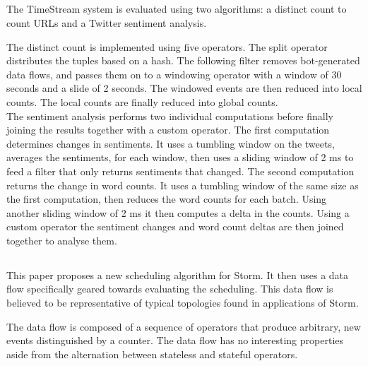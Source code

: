 \subsection{}
The TimeStream system\cite{timestream} is evaluated using two algorithms: a distinct count to count URLs and a Twitter sentiment analysis. \\


The distinct count is implemented using five operators. The split operator distributes the tuples based on a hash. The following filter removes bot-generated data flows, and passes them on to a windowing operator with a window of 30 seconds and a slide of 2 seconds. The windowed events are then reduced into local counts. The local counts are finally reduced into global counts. \\

The sentiment analysis performs two individual computations before finally joining the results together with a custom operator. The first computation determines changes in sentiments. It uses a tumbling window on the tweets, averages the sentiments, for each window, then uses a sliding window of 2 ms to feed a filter that only returns sentiments that changed. The second computation returns the change in word counts. It uses a tumbling window of the same size as the first computation, then reduces the word counts for each batch. Using another sliding window of 2 ms it then computes a delta in the counts. Using a custom operator the sentiment changes and word count deltas are then joined together to analyse them.

\subsection{}
This paper proposes a new scheduling algorithm for Storm. It then uses a data flow specifically geared towards evaluating the scheduling. This data flow is believed to be representative of typical topologies found in applications of Storm.\\


The data flow is composed of a sequence of operators that produce arbitrary, new events distinguished by a counter. The data flow has no interesting properties aside from the alternation between stateless and stateful operators.

